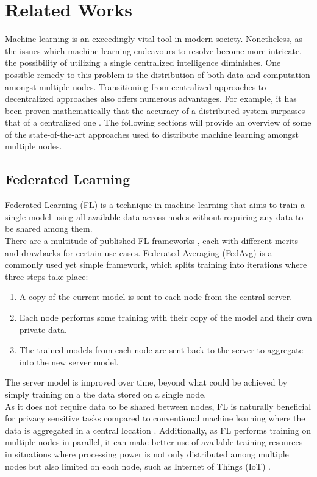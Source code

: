 \chapter{Related Works} \label{bg}
Machine learning is an exceedingly vital tool in modern society. Nonetheless, as the issues which machine learning endeavours to resolve become more intricate, the possibility of utilizing a single centralized intelligence diminishes. One possible remedy to this problem is the distribution of both data and computation amongst multiple nodes. Transitioning from centralized approaches to decentralized approaches also offers numerous advantages. For example, it has been proven mathematically that the accuracy of a distributed system surpasses that of a centralized one \cite{swarmbetterthanone}. The following sections will provide an overview of some of the state-of-the-art approaches used to distribute machine learning amongst multiple nodes.

\section{Federated Learning}
Federated Learning (FL) \cite{survey_on_fed_learning} is a technique in machine learning that aims to train a single model using all available data across nodes without requiring any data to be shared among them. \\

There are a multitude of published FL frameworks \cite{fed_table_survey}, each with different merits and drawbacks for certain use cases. Federated Averaging (FedAvg) \cite{fed_learning} is a commonly used yet simple framework, which splits training into iterations where three steps take place:
\begin{enumerate}
	\item A copy of the current model is sent to each node from the central server.
	\item Each node performs some training with their copy of the model and their own private data.
	\item The trained models from each node are sent back to the server to aggregate into the new server model.
\end{enumerate}
The server model is improved over time, beyond what could be achieved by simply training on a the data stored on a single node. \\

As it does not require data to be shared between nodes, FL is naturally beneficial for privacy sensitive tasks compared to conventional machine learning where the data is aggregated in a central location \cite{fed_privacy}. Additionally, as FL performs training on multiple nodes in parallel, it can make better use of available training resources in situations where processing power is not only distributed among multiple nodes but also limited on each node, such as Internet of Things (IoT) \cite{fed_iot_2}.

